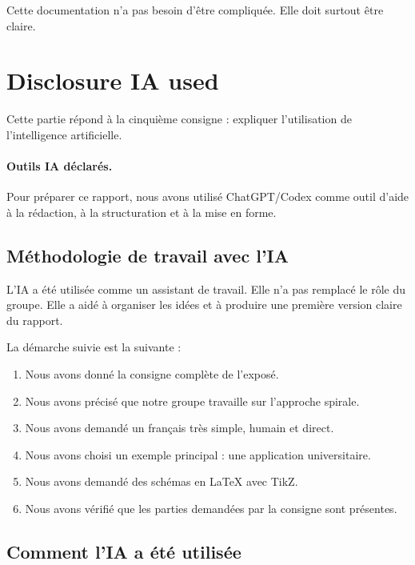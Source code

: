 \documentclass[12pt,a4paper]{article}
\begin{document}
Cette documentation n'a pas besoin d'être compliquée. Elle doit surtout être claire.

\newpage

\section{Disclosure IA used}

Cette partie répond à la cinquième consigne : expliquer l'utilisation de l'intelligence artificielle.

\paragraph{Outils IA déclarés.}
Pour préparer ce rapport, nous avons utilisé ChatGPT/Codex comme outil d'aide à la rédaction, à la structuration et à la mise en forme.

\subsection{Méthodologie de travail avec l'IA}

L'IA a été utilisée comme un assistant de travail. Elle n'a pas remplacé le rôle du groupe. Elle a aidé à organiser les idées et à produire une première version claire du rapport.

La démarche suivie est la suivante :

\begin{enumerate}
    \item Nous avons donné la consigne complète de l'exposé.
    \item Nous avons précisé que notre groupe travaille sur l'approche spirale.
    \item Nous avons demandé un français très simple, humain et direct.
    \item Nous avons choisi un exemple principal : une application universitaire.
    \item Nous avons demandé des schémas en LaTeX avec TikZ.
    \item Nous avons vérifié que les parties demandées par la consigne sont présentes.
\end{enumerate}

\subsection{Comment l'IA a été utilisée}
\end{document}
